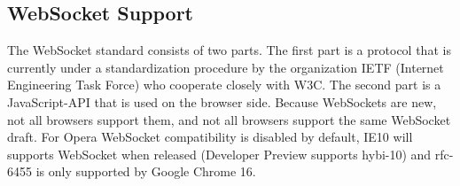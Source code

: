 \subsection{WebSocket Support}

The WebSocket standard consists of two parts.
The first part is a protocol that is currently under a standardization 
procedure by the organization IETF (Internet Engineering Task Force) who 
cooperate closely with W3C. The second part is a 
JavaScript-API that is used on the browser side\cite{andersen10}. 
Because WebSockets are new, not all browsers support them, and not all 
browsers support the same WebSocket draft\cite{websocketprotocol11}.  For Opera WebSocket compatibility is disabled by 
default\cite{websocketprotocol11}, IE10 will supports WebSocket when released (Developer Preview supports hybi-10) and rfc-6455 is only supported by 
Google Chrome 16\cite{websocketecho}.